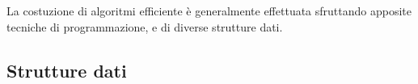 \documentclass{subfiles}
\begin{document}
La costuzione di algoritmi efficiente è generalmente effettuata sfruttando apposite tecniche di programmazione, e di diverse strutture dati.

\subsection{Strutture dati}

\end{document}
